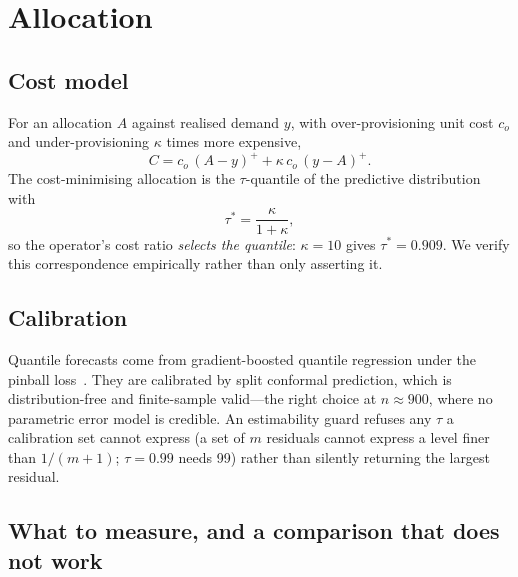 \documentclass[conference]{IEEEtran}
\begin{document}
\section{Allocation}
\label{sec:alloc}

\subsection{Cost model}

For an allocation $A$ against realised demand $y$, with over-provisioning unit cost
$c_{o}$ and under-provisioning $\kappa$ times more expensive,
\begin{equation}
C = c_{o}\,(A-y)^{+} + \kappa\,c_{o}\,(y-A)^{+} .
\end{equation}
The cost-minimising allocation is the $\tau$-quantile of the predictive distribution
with
\begin{equation}
\tau^{*} = \frac{\kappa}{1+\kappa},
\end{equation}
so the operator's cost ratio \emph{selects the quantile}: $\kappa = 10$ gives
$\tau^{*} = 0.909$. We verify this correspondence empirically rather than only
asserting it.

\subsection{Calibration}

Quantile forecasts come from gradient-boosted quantile regression under the pinball
loss~\cite{koenker1978regression}. They are calibrated by split conformal prediction,
which is
distribution-free and finite-sample valid---the right choice at $n \approx 900$, where
no parametric error model is credible. An estimability guard refuses any $\tau$ a
calibration set cannot express (a set of $m$ residuals cannot express a level finer
than $1/(m+1)$; $\tau = 0.99$ needs 99) rather than silently returning the largest
residual.

\subsection{What to measure, and a comparison that does not work}
\label{sec:cost}
\end{document}
